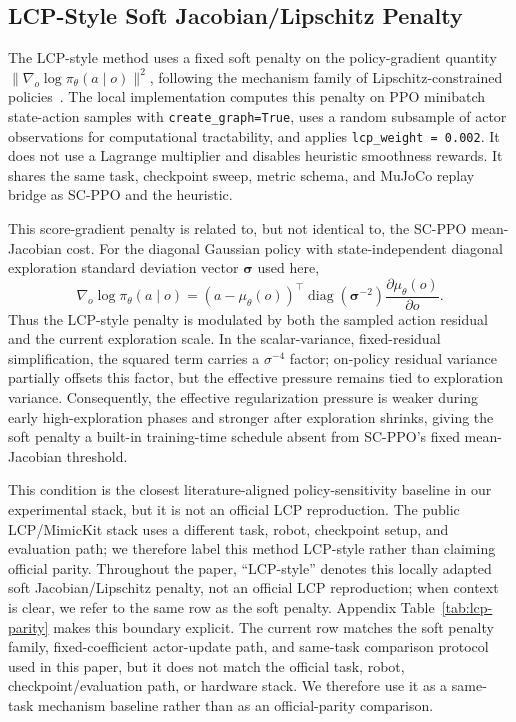 \documentclass[10pt]{article}
\begin{document}
\subsection{LCP-Style Soft Jacobian/Lipschitz Penalty}

The LCP-style method uses a fixed soft penalty on the policy-gradient quantity
$\|\nabla_o \log \pi_\theta(a \mid o)\|^2$, following the mechanism family of
Lipschitz-constrained policies~\citep{Chen2024LCP}. The local implementation
computes this penalty on PPO minibatch state-action samples with
\texttt{create\_graph=True}, uses a random subsample of actor observations for
computational tractability, and applies \texttt{lcp\_weight = 0.002}. It does
not use a Lagrange multiplier and disables heuristic smoothness rewards. It
shares the same task, checkpoint sweep, metric schema, and MuJoCo replay bridge
as SC-PPO and the heuristic.

This score-gradient penalty is related to, but not identical to, the SC-PPO
mean-Jacobian cost. For the diagonal Gaussian policy with state-independent
diagonal exploration standard deviation vector $\boldsymbol{\sigma}$ used here,
\begin{equation}
  \nabla_o \log \pi_\theta(a \mid o)
  =
  (a-\mu_\theta(o))^\top
  \operatorname{diag}(\boldsymbol{\sigma}^{-2})
  \frac{\partial \mu_\theta(o)}{\partial o}.
\end{equation}
Thus the LCP-style penalty is modulated by both the sampled action residual and
the current exploration scale. In the scalar-variance, fixed-residual
simplification, the squared term carries a $\sigma^{-4}$ factor; on-policy
residual variance partially offsets this factor, but the effective pressure
remains tied to exploration variance. Consequently, the effective
regularization pressure is weaker during early high-exploration phases and
stronger after exploration shrinks, giving the soft penalty a built-in
training-time schedule absent from SC-PPO's fixed mean-Jacobian threshold.

This condition is the closest literature-aligned policy-sensitivity baseline in
our experimental stack, but it is not an official LCP reproduction. The public
LCP/MimicKit stack uses a different task, robot, checkpoint setup, and
evaluation path; we therefore label this method LCP-style rather than claiming
official parity.
Throughout the paper, ``LCP-style'' denotes this locally adapted soft
Jacobian/Lipschitz penalty, not an official LCP reproduction; when context is
clear, we refer to the same row as the soft penalty.
Appendix Table~\ref{tab:lcp-parity} makes this boundary explicit. The current
row matches the soft penalty family, fixed-coefficient actor-update path, and
same-task comparison protocol used in this paper, but it does not match the
official task, robot, checkpoint/evaluation path, or hardware stack. We
therefore use it as a same-task mechanism baseline rather than as an
official-parity comparison.
\end{document}
